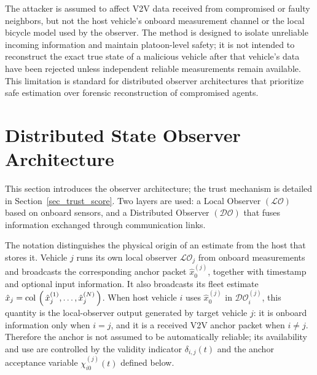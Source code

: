 \documentclass[letterpaper,journal]{IEEEtran}
\def\col#1{\mathop{{\rm col}\,\left(\,#1\,\right)}}
\def\LO{\mathcal{LO}} %
\def\DO{\mathcal{DO}} %
\begin{document}
The attacker is assumed to affect V2V data received from compromised or faulty neighbors, but not the host vehicle's onboard measurement channel or the local bicycle model used by the observer. The method is designed to isolate unreliable incoming information and maintain platoon-level safety; it is not intended to reconstruct the exact true state of a malicious vehicle after that vehicle's data have been rejected unless independent reliable measurements remain available. This limitation is standard for distributed observer architectures that prioritize safe estimation over forensic reconstruction of compromised agents.

\section{Distributed State Observer Architecture}\label{sec_distributed_observer}
This section introduces the observer architecture; the trust mechanism is detailed in Section~\ref{sec_trust_score}. Two layers are used: a Local Observer $(\LO)$ based on onboard sensors, and a Distributed Observer $(\DO)$ that fuses information exchanged through communication links.

The notation distinguishes the physical origin of an estimate from the host that stores it. Vehicle $j$ runs its own local observer $\LO_j$ from onboard measurements and broadcasts the corresponding anchor packet $\hat{x}_0^{(j)}$, together with timestamp and optional input information. It also broadcasts its fleet estimate $\hat{x}_j=\col{\hat{x}_j^{(1)},\ldots,\hat{x}_j^{(N)}}$. When host vehicle $i$ uses $\hat{x}_0^{(j)}$ in $\DO_i^{(j)}$, this quantity is the local-observer output generated by target vehicle $j$: it is onboard information only when $i=j$, and it is a received V2V anchor packet when $i\neq j$. Therefore the anchor is not assumed to be automatically reliable; its availability and use are controlled by the validity indicator $\delta_{i,j}(t)$ and the anchor acceptance variable $\chi_{i0}^{(j)}(t)$ defined below.
\end{document}

